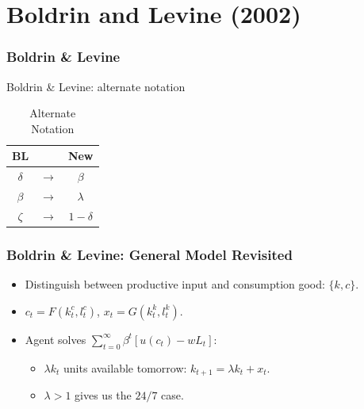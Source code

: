 \documentclass{beamer}
\begin{document}
\section{Boldrin and Levine (2002)}
\label{sec:boldrin_and_levine_2002}

\begin{frame}
  \frametitle{Boldrin \& Levine}
  Boldrin \& Levine: alternate notation\\
  \begin{table}[ht]
    \caption{Alternate Notation}
    \centering
  \begin{tabular}{c c c}
    \hline\hline
      BL &  & New\\ [0.5ex] 
    \hline
    $\delta$ & $\longrightarrow$ & $\beta$  \\ 
    $\beta$ & $\longrightarrow$ & $\lambda$ \\
    $\zeta$ & $\longrightarrow$ & $1 - \delta$ \\[1ex] 
    \hline
   \end{tabular}
   \label{table:altnot}
  \end{table}
\end{frame}

\begin{frame}[t]
  \frametitle{Boldrin \& Levine: General Model Revisited}
  \begin{itemize}
    \item<+-> Distinguish between productive input and consumption good: $\{k,c\}$.
	\vspace{2mm}
    \item<+-> $c_t = F(k_t^c,l_t^c)$, $x_t = G(k_t^k,l_t^k)$.
	\vspace{2mm}
    \item<+-> Agent solves $\sum_{t=0}^\infty\beta^t[u(c_t)-wL_t]$:
    \begin{itemize}
		\vspace{2mm}
        \item<+-> $\lambda k_t$ units available tomorrow: $k_{t+1} = \lambda k_t + x_t$.
        \vspace{2mm}
		\item<+-> $\lambda > 1$ gives us the $24/7$ case.
    \end{itemize}
  \end{itemize}
\end{frame}
\end{document}
